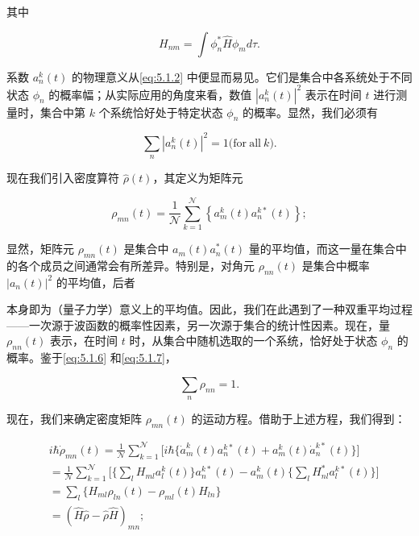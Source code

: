 其中

\begin{equation}\tag{5.1.5}\label{eq:5.1.5}
H _ { n m } = \int \phi _ { n } ^{*} \hat { H } \phi _ { m } d \tau .
\end{equation}

系数 \(a_{n}^{k}(t)\) 的物理意义从\autoref{eq:5.1.2} 中便显而易见。它们是集合中各系统处于不同状态 \(\phi_{n}\) 的概率幅；从实际应用的角度来看，数值 \(|a_{n}^{k}(t)|^{2}\) 表示在时间 \(t\) 进行测量时，集合中第 \(k\) 个系统恰好处于特定状态 \(\phi_{n}\) 的概率。显然，我们必须有

\begin{equation}\tag{5.1.6}\label{eq:5.1.6}
\sum _ { n } | a _ { n } ^{k} ( t ) | ^{2} = 1  { \mathrm { ( f o r ~ a l l ~ } } k { \mathrm { ) } } .
\end{equation}

现在我们引入密度算符 \(\hat{\rho}(t)\)，其定义为矩阵元

\begin{equation}\tag{5.1.7}\label{eq:5.1.7}
\rho _ { m n } ( t ) = \frac { 1 } { \mathcal { N } } \sum _ { k = 1 } ^{\mathcal { N} } \left\{ a _ { m } ^{k} ( t ) a _ { n } ^{k *} ( t ) \right\} ;
\end{equation}

显然，矩阵元 \(\rho_{mn}(t)\) 是集合中 \(a_{m}(t)a_{n}^{*}(t)\) 量的平均值，而这一量在集合中的各个成员之间通常会有所差异。特别是，对角元 \(\rho_{nn}(t)\) 是集合中概率 \(|a_{n}(t)|^{2}\) 的平均值，后者

本身即为（量子力学）意义上的平均值。因此，我们在此遇到了一种双重平均过程------一次源于波函数的概率性因素，另一次源于集合的统计性因素。现在，量 \(\rho_{nn}(t)\) 表示，在时间 \(t\) 时，从集合中随机选取的一个系统，恰好处于状态 \(\phi_{n}\) 的概率。鉴于\autoref{eq:5.1.6} 和\autoref{eq:5.1.7}，

\begin{equation}\tag{5.1.8}\label{eq:5.1.8}
\sum _ { n } \rho _ { n n } = 1 .
\end{equation}

现在，我们来确定密度矩阵 \(\rho_{mn}(t)\) 的运动方程。借助于上述方程，我们得到：

\begin{equation}\tag{5.1.9}\label{eq:5.1.9}
\begin{array}{rl} & { i \hbar \dot { \rho } _ { m n } ( t ) = \frac { 1 } { \mathcal { N } } \sum _ { k = 1 } ^{\mathcal { N} } \Big [ i \hbar \Big \{ \dot { a } _ { m } ^{k} ( t ) a _ { n } ^{k *} ( t ) + a _ { m } ^{k} ( t ) \dot { a } _ { n } ^{k *} ( t ) \Big \} \Big ] } \\& {  = \frac { 1 } { \mathcal { N } } \sum _ { k = 1 } ^{\mathcal { N} } \Big [ \Big \{ \sum _ { l } H _ { m l } a _ { l } ^{k} ( t ) \Big \} a _ { n } ^{k *} ( t ) - a _ { m } ^{k} ( t ) \Big \{ \sum _ { l } H _ { n l } ^{*} a _ { l } ^{k *} ( t ) \Big \} \Big ] } \\& {  = \sum _ { l } \{ H _ { m l } \rho _ { l n } ( t ) - \rho _ { m l } ( t ) H _ { l n } \} } \\& {  = ( \hat { H } \hat { \rho } - \hat { \rho } \hat { H } ) _ { m n } ; } \end{array}
\end{equation}

